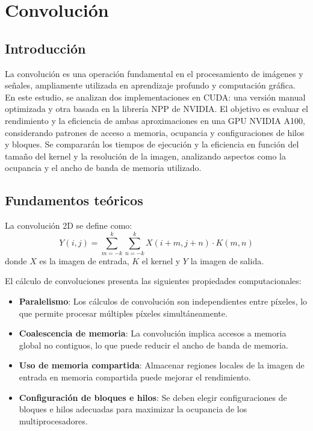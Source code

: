 \chapter{Convolución}
\section{Introducción}

La convolución es una operación fundamental en el procesamiento de imágenes y señales, ampliamente utilizada en aprendizaje profundo y computación gráfica. En este estudio, se analizan dos implementaciones en CUDA: una versión manual optimizada y otra basada en la librería NPP de NVIDIA. El objetivo es evaluar el rendimiento y la eficiencia de ambas aproximaciones en una GPU NVIDIA A100, considerando patrones de acceso a memoria, ocupancia y configuraciones de hilos y bloques. Se compararán los tiempos de ejecución y la eficiencia en función del tamaño del kernel y la resolución de la imagen, analizando aspectos como la ocupancia y el ancho de banda de memoria utilizado.  



\section{Fundamentos teóricos}

La convolución 2D se define como:
\begin{equation}
Y(i, j) = \sum_{m=-k}^{k} \sum_{n=-k}^{k} X(i+m, j+n) \cdot K(m, n)
\end{equation}
donde $X$ es la imagen de entrada, $K$ el kernel y $Y$ la imagen de salida.


El cálculo de convoluciones presenta las siguientes propiedades computacionales:

\begin{itemize}
\item \textbf{Paralelismo}: Los cálculos de convolución son independientes entre píxeles, lo que permite procesar múltiples píxeles simultáneamente.
\item \textbf{Coalescencia de memoria}: La convolución implica accesos a memoria global no contiguos, lo que puede reducir el ancho de banda de memoria.
\item \textbf{Uso de memoria compartida}: Almacenar regiones locales de la imagen de entrada en memoria compartida puede mejorar el rendimiento.
\item \textbf{Configuración de bloques e hilos}: Se deben elegir configuraciones de bloques e hilos adecuadas para maximizar la ocupancia de los multiprocesadores.
\end{itemize}



